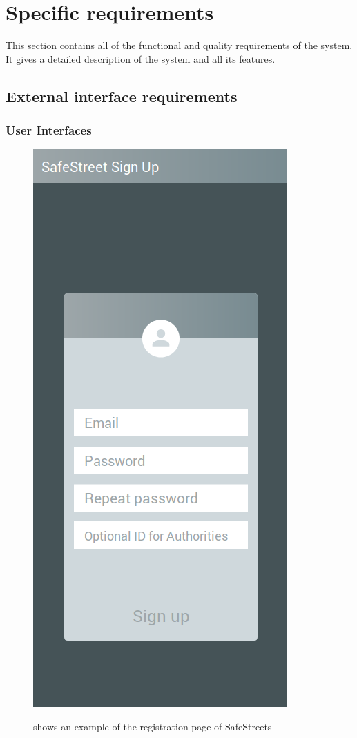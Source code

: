 \documentclass[../RASD.tex]{subfiles}
\begin{document}
    \chapter{Specific requirements}\label{ch:specific-requirements}
    This section contains all of the functional and quality requirements of the system. It gives a detailed description of the system and all its features.
        \section{External interface requirements}\label{sec:external-interface-requirements}
            \subsection{User Interfaces}\label{subsec:user-interfaces}
            \begin{figure}[H]
                \centering
                \includegraphics[scale = 0.4]{assets/signup.png}\\[1.6 cm]
                \caption[\textit{User} Sign Up \textit{Mockup}]{shows an example of the registration page of SafeStreets}
            \end{figure}
\end{document}
